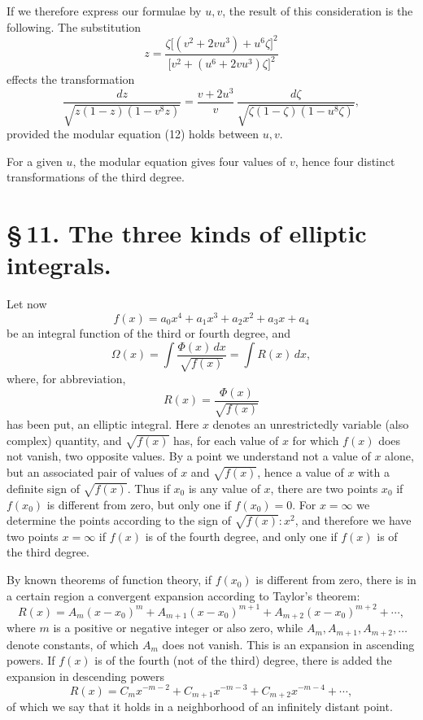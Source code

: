 \documentclass[11pt]{article}
\begin{document}
If we therefore express our formulae by $u,v$, the result of this consideration is the following. The substitution
\[
z=\frac{\zeta\bigl[(v^2+2vu^3)+u^6\zeta\bigr]^2}
{\bigl[v^2+(u^6+2vu^3)\zeta\bigr]^2}
\]
effects the transformation
\[
\frac{dz}{\sqrt{z(1-z)(1-v^8z)}}
=
\frac{v+2u^3}{v}\,
\frac{d\zeta}{\sqrt{\zeta(1-\zeta)(1-u^8\zeta)}},
\]
provided the modular equation (12) holds between $u,v$.

For a given $u$, the modular equation gives four values of $v$, hence four distinct transformations of the third degree.

\section*{\S\,11. The three kinds of elliptic integrals.}

Let now
\begin{equation}
f(x)=a_0x^4+a_1x^3+a_2x^2+a_3x+a_4
\tag{1}
\end{equation}
be an integral function of the third or fourth degree, and
\begin{equation}
\Omega(x)=\int\frac{\Phi(x)\,dx}{\sqrt{f(x)}}=\int R(x)\,dx,
\tag{2}
\end{equation}
where, for abbreviation,
\begin{equation}
R(x)=\frac{\Phi(x)}{\sqrt{f(x)}}
\tag{3}
\end{equation}
has been put, an elliptic integral. Here $x$ denotes an unrestrictedly variable (also complex) quantity, and $\sqrt{f(x)}$ has, for each value of $x$ for which $f(x)$ does not vanish, two opposite values. By a point we understand not a value of $x$ alone, but an associated pair of values of $x$ and $\sqrt{f(x)}$, hence a value of $x$ with a definite sign of $\sqrt{f(x)}$. Thus if $x_0$ is any value of $x$, there are two points $x_0$ if $f(x_0)$ is different from zero, but only one if $f(x_0)=0$. For $x=\infty$ we determine the points according to the sign of $\sqrt{f(x)}:x^2$, and therefore we have two points $x=\infty$ if $f(x)$ is of the fourth degree, and only one if $f(x)$ is of the third degree.

By known theorems of function theory, if $f(x_0)$ is different from zero, there is in a certain region a convergent expansion according to Taylor's theorem:
\begin{equation}
R(x)=A_m(x-x_0)^m+A_{m+1}(x-x_0)^{m+1}+A_{m+2}(x-x_0)^{m+2}+\cdots,
\tag{4}
\end{equation}
where $m$ is a positive or negative integer or also zero, while $A_m,A_{m+1},A_{m+2},\ldots$ denote constants, of which $A_m$ does not vanish. This is an expansion in ascending powers. If $f(x)$ is of the fourth (not of the third) degree, there is added the expansion in descending powers
\begin{equation}
R(x)=C_mx^{-m-2}+C_{m+1}x^{-m-3}+C_{m+2}x^{-m-4}+\cdots,
\tag{5}
\end{equation}
of which we say that it holds in a neighborhood of an infinitely distant point.
\end{document}
